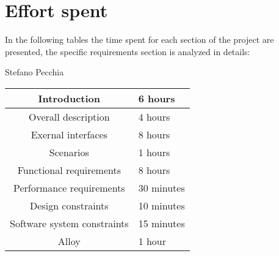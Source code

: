\chapter{Effort spent}
In the following tables the time spent for each section of the project are presented, the specific requirements section is analyzed in details:


Stefano Pecchia
\begin{center}
\begin{tabular}{|c|p{3cm}|}
    \hline
    Introduction & 6 hours
    \\ \hline
    Overall description & 4 hours
    \\ \hline 
    Exernal interfaces & 8 hours
     \\ \hline 
    Scenarios & 1 hours
       \\ \hline 
    Functional requirements & 8 hours
      \\ \hline 
    Performance requirements & 30 minutes
 	   \\ \hline 
 	Design constraints & 10 minutes
 	   \\ \hline 
 	Software system constraints & 15 minutes
    \\ \hline
    Alloy & 1 hour
	\\ \hline
	\end{tabular}
\end{center}